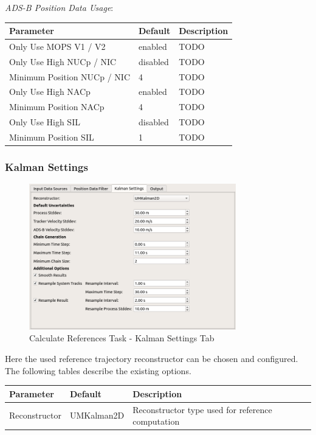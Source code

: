 \textit{ADS-B Position Data Usage}:
\begin{table}[H]
    \center
    \begin{tabularx}{\textwidth}{ | l | l | X |}
        \hline
        \textbf{Parameter} & \textbf{Default} & \textbf{Description} \\ \hline
        Only Use MOPS V1 / V2 & enabled & TODO \\ \hline
        Only Use High NUCp / NIC & disabled & TODO \\ \hline
        Minimum Position NUCp / NIC & 4 & TODO \\ \hline
        Only Use High NACp & enabled & TODO \\ \hline
        Minimum Position NACp & 4 & TODO \\ \hline
        Only Use High SIL & disabled & TODO \\ \hline
        Minimum Position SIL & 1 & TODO \\ \hline
    \end{tabularx}
\end{table}

\subsubsection*{Kalman Settings}

\begin{figure}[H]
    \center
      \includegraphics[width=9cm]{figures/ui_task_references_tab_kalman.png}
    \caption{Calculate References Task - Kalman Settings Tab}
\end{figure}

Here the used reference trajectory reconstructor can be chosen and configured.
The following tables describe the existing options.

\begin{table}[H]
    \center
    \begin{tabularx}{\textwidth}{ | l | l | X |}
        \hline
        \textbf{Parameter} & \textbf{Default} & \textbf{Description} \\ \hline
        Reconstructor & UMKalman2D & Reconstructor type used for reference computation \\ \hline
    \end{tabularx}
\end{table}

